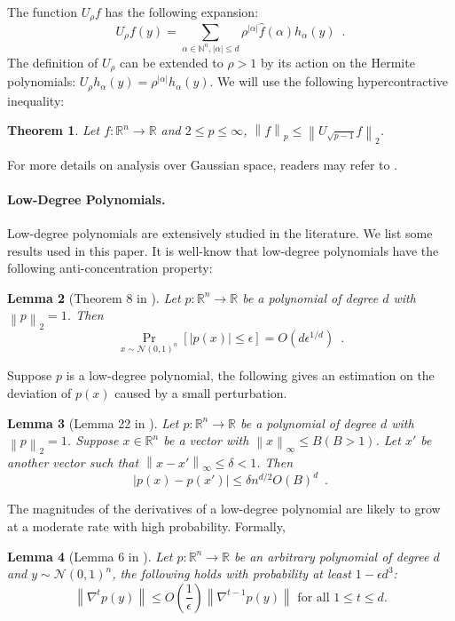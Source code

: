 \documentclass[12pt]{article}
\newtheorem{theorem}{Theorem}[section]
\newtheorem{lemma}[theorem]{Lemma}
\newcommand{\N}{\mathbb{N}}  \newcommand{\R}{\mathbb{R}} \newcommand{\C}{\mathbb{C}} \newcommand{\U}{\mathbb{U}} \renewcommand{\d}{\mathrm{d}} \DeclareMathOperator*{\E}{\mathbb{E}}  \newcommand{\so}{\mathrm{SO}} \newcommand{\s}{\mathrm{S}} \newcommand{\su}{\mathrm{SU}} \renewcommand{\i}{\mathrm{i}} \newcommand{\A}{\mathcal{A}}  \newcommand{\B}{\mathcal{B}} \newcommand{\CC}{\mathcal{C}} \newcommand{\D}{\mathcal{D}} \newcommand{\F}{\mathcal{F}} \renewcommand{\H}{\mathcal{H}} \newcommand{\K}{\mathcal{K}} \newcommand{\NN}{\mathcal{N}} \newcommand{\V}{\mathcal{V}} \newcommand{\X}{\mathcal{X}} \newcommand{\Y}{\mathcal{Y}} \renewcommand{\S}{\mathcal{S}} \newcommand{\SR}{\mathcal{S}_{\R}} \newcommand{\SC}{\mathcal{S}_{\C}} \newcommand{\EE}{\mathcal{E}}  \newcommand{\PP}{\mathcal{P}} \newcommand{\KK}{\widetilde{K}} \newcommand{\LL}{\widetilde{L}} \newcommand{\W}{\widehat{W}} \newcommand{\f}{\hat{f}} \newcommand{\g}{\hat{g}} \newcommand{\h}{\hat{h}} \newcommand{\bit}[1]{\{0,1\}^{#1}} \newcommand{\wrt}{w.r.t.~} \newcommand{\us}{\overset{\$}{\leftarrow}} \newcommand{\set}[1]{\left\{#1\right\}} \newcommand{\lhs}{\mathrm{LHS}} \newcommand{\expec}[1]{\E\!\Br{#1}} \newcommand{\expect}[2]{\E_{\substack{#1}}\!\Br{#2}} \newcommand{\prob}[2]{\underset{#1}{\mathrm{Pr}}\!\Br{#2}} \newcommand{\cf}{\widetilde{f}} \newcommand{\cg}{\widetilde{g}} \newcommand{\ch}{\widetilde{h}} \newcommand{\ck}{\widetilde{K}} \newcommand{\rep}[2]{\br{#1}_{#2}} \newcommand{\AND}[1]{\mathrm{AND}\!\br{#1}}
\newcommand{\grad}[2]{\nabla^{#1}{#2}}
\newcommand{\br}[1]{\left(#1\right)} \newcommand{\Br}[1]{\left[#1\right]} \newcommand{\st}[1]{\left\{#1\right\}} \newcommand{\tr}[1]{\mathrm{Tr}\!\Br{#1}} \newcommand{\abs}[1]{\left|#1 \right|} \newcommand{\norm}[1]{\left\lVert #1 \right\rVert} \newcommand{\agl}[2]{\theta^{\br{#1}}_{#2}} \newcommand{\aglp}[2]{{\theta'}^{\br{#1}}_{#2}} \newcommand{\lint}[1]{\left\lfloor#1\right\rfloor} \newcommand{\poly}[1]{\mathrm{poly}\!\br{#1}} \newcommand{\negl}[1]{\mathrm{negl}\!\br{#1}} \newcommand{\de}[1]{\mathrm{d}#1} \newcommand{\val}[1]{\mathrm{val}\!\br{#1}} \newcommand{\vall}[1]{\mathrm{val}\br{#1}} \newcommand{\nd}[1]{\mathcal{N}\!\br{#1}} \newcommand{\ketbratwo}[2]{\ket{#1} \hspace{-0.4em}\bra{#2}} \newcommand{\ketbra}[1]{\ketbratwo{#1}{#1}} \newcommand{\id}{\ensuremath{\mathds{1}}} \newcommand{\ogroup}[1]{\mathrm{O}\!\br{#1}} \newcommand{\ugroup}[1]{\mathrm{U}\!\br{#1}} \newcommand{\td}{\mathrm{TD}} \newcommand{\tv}[1]{\norm{#1}_{\mathrm{TV}}} \newcommand {\defeq} {\ensuremath{ \stackrel{\mathrm{def}}{=} }} \newcommand{\vdim}{\ensuremath{N}} \newcommand{\dimin}{\ensuremath{n}} \newcommand{\dimout}{\ensuremath{m}} \newcommand{\ncopy}{\ell} \newcommand{\hspacein}{\H_\mathrm{in}} \newcommand{\hspaceout}{\H_\mathrm{out}} \newcommand{\Sin}{\S(\hspacein)} \newcommand{\Sout}{\S(\hspaceout)} \newcommand{\haar}{\ensuremath{\mu}} \newcommand{\tensorhaar}{\ensuremath{\eta}} \newcommand{\tensorsrss}{\ensuremath{\nu}} \newcommand{\qadvice}{\ensuremath{\rho}} \newcommand{\tp}{\otimes} \newcommand{\wone}[2]{W_1\!\br{#1,#2}}
\begin{document}
The function $U_{\rho}f$ has the following expansion:
\[
	U_\rho f(y) = \sum_{\alpha\in\N^n, \abs{\alpha}\leq d} \rho^{\abs{\alpha}}\widehat{f}(\alpha) h_{\alpha}(y)\enspace.
\]
The definition of $U_\rho$ can be extended to $\rho>1$ by its action on the Hermite polynomials: $U_{\rho}h_{\alpha}(y) = \rho^{\abs{\alpha}}h_{\alpha}(y)$.
We will use the following hypercontractive inequality:
\begin{theorem}\label{thm:hc}
	Let $f:\R^n\to\R$ and $2\leq p\leq \infty$, $\norm{f}_p \leq \norm{U_{\sqrt{p-1}}f}_2$.
\end{theorem}
For more details on analysis over Gaussian space, readers may refer to \cite{O14}. 

\paragraph{Low-Degree Polynomials.}
Low-degree polynomials are extensively studied in the literature.
We list some results used in this paper.
It is well-know that low-degree polynomials have the following anti-concentration property:
\begin{lemma}[Theorem 8 in \cite{CW01}]\label{lem:anti}
	Let $p:\R^n\to\R$ be a polynomial of degree $d$ with $\norm{p}_2=1$. Then 
	\[
		\Pr_{x\sim \NN(0,1)^n} [\abs{p(x)}\leq \epsilon] = O(d\epsilon^{1/d}) \enspace .
	\]
\end{lemma}

Suppose $p$ is a low-degree polynomial, the following gives an estimation on the deviation of $p(x)$ caused by a small perturbation.
\begin{lemma}[Lemma 22 in \cite{Kan11b}] \label{lem:close}
	Let $p:\R^n\to\R$ be a polynomial of degree $d$ with $\norm{p}_2=1$. Suppose $x\in\R^n$ be a vector with $\norm{x}_\infty\leq B(B>1)$. Let $x'$ be another vector such that $\norm{x-x'}_\infty\leq \delta<1$. Then 
	\[
		\abs{p(x)-p(x')}\leq \delta n^{d/2}O(B)^d \enspace .
	\]
\end{lemma}

The magnitudes of the derivatives of a low-degree polynomial are likely to grow at a moderate rate with high probability. Formally,
\begin{lemma}[Lemma 6 in \cite{KM22}]\label{lem:good_event}
	Let $p:\R^n \to \R$ be an arbitrary polynomial of degree $d$ and $y\sim\NN\br{0,1}^n$,
	the following holds with probability at least $1-\epsilon d^3$:
	\[
		\norm{\grad{t}{p(y)}} \leq O\br{\frac{1}{\epsilon}} \norm{\grad{t-1}{p(y)}}
		\text{ for all } 1\leq t\leq d.
	\]
\end{lemma}
\end{document}
